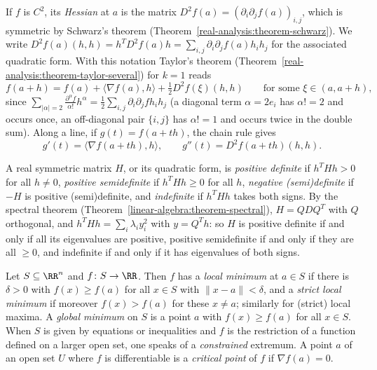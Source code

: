 If $f$ is $C^2$, its \emph{Hessian} at $a$ is the matrix $D^2f(a) = (\partial_i\partial_jf(a))_{i,j}$, which is symmetric by Schwarz's theorem (Theorem~\ref{real-analysis:theorem-schwarz}). We write
$D^2f(a)(h, h) = h^TD^2f(a)h = \sum_{i,j}\partial_i\partial_jf(a)h_ih_j$ for the associated quadratic form. With this notation Taylor's theorem (Theorem~\ref{real-analysis:theorem-taylor-several}) for $k = 1$ reads
\begin{equation}\label{real-analysis:equation-taylor-hessian}
f(a + h) = f(a) + \langle\nabla f(a), h\rangle + \tfrac12D^2f(\xi)(h, h) \qquad \text{for some } \xi \in (a, a + h),
\end{equation}
since $\sum_{|\alpha| = 2}\frac{\partial^\alpha f}{\alpha!}h^\alpha = \frac12\sum_{i,j}\partial_i\partial_jfh_ih_j$ (a diagonal term $\alpha = 2e_i$ has $\alpha! = 2$ and occurs once, an off-diagonal pair $\{i, j\}$ has
$\alpha! = 1$ and occurs twice in the double sum). Along a line, if $g(t) = f(a + th)$, the chain rule gives
\begin{equation}\label{real-analysis:equation-line-derivatives}
g'(t) = \langle\nabla f(a + th), h\rangle, \qquad g''(t) = D^2f(a + th)(h, h).
\end{equation}

A real symmetric matrix $H$, or its quadratic form, is \emph{positive definite} if $h^THh > 0$ for all $h \neq 0$, \emph{positive semidefinite} if $h^THh \geq 0$ for all $h$, \emph{negative (semi)definite} if
$-H$ is positive (semi)definite, and \emph{indefinite} if $h^THh$ takes both signs. By the spectral theorem (Theorem~\ref{linear-algebra:theorem-spectral}), $H = QDQ^T$ with $Q$ orthogonal, and
$h^THh = \sum_i\lambda_iy_i^2$ with $y = Q^Th$: so $H$ is positive definite if and only if all its eigenvalues are positive, positive semidefinite if and only if they are all $\geq 0$, and indefinite if
and only if it has eigenvalues of both signs.

\begin{definition}\label{real-analysis:definition-local-extremum-several}
Let $S \subseteq \RR^n$ and $f \colon S \to \RR$. Then $f$ has a \emph{local minimum} at $a \in S$ if there is $\delta > 0$ with $f(x) \geq f(a)$ for all $x \in S$ with $\|x - a\| < \delta$, and a \emph{strict local
minimum} if moreover $f(x) > f(a)$ for these $x \neq a$; similarly for (strict) local maxima. A \emph{global minimum} on $S$ is a point $a$ with $f(x) \geq f(a)$ for all $x \in S$. When $S$ is given by
equations or inequalities and $f$ is the restriction of a function defined on a larger open set, one speaks of a \emph{constrained} extremum. A point $a$ of an open set $U$ where $f$ is differentiable
is a \emph{critical point} of $f$ if $\nabla f(a) = 0$.
\end{definition}

